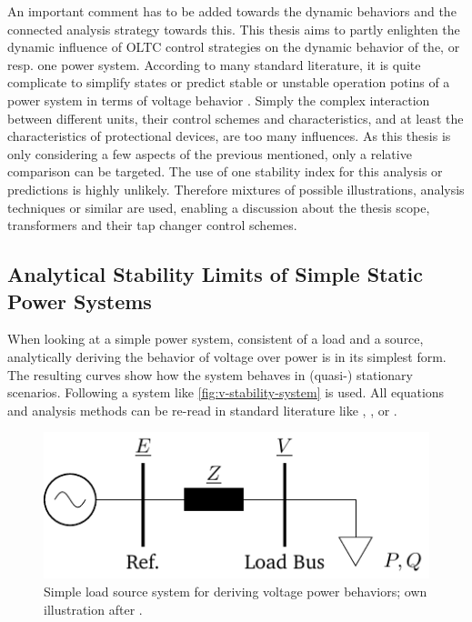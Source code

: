 An important comment has to be added towards the dynamic behaviors and the connected analysis strategy towards this.
This thesis aims to partly enlighten the dynamic influence of \acs{OLTC} control strategies on the dynamic behavior of the, or resp. one power system.
According to many standard literature, it is quite complicate to simplify states or predict stable or unstable operation potins of a power system in terms of voltage behavior \autocite{machowski_2020}.
Simply the complex interaction between different units, their control schemes and characteristics, and at least the characteristics of protectional devices, are too many influences.
As this thesis is only considering a few aspects of the previous mentioned, only a relative comparison can be targeted.
The use of one stability index for this analysis or predictions is highly unlikely.
Therefore mixtures of possible illustrations, analysis techniques or similar are used, enabling a discussion about the thesis scope, transformers and their tap changer control schemes.  
        
\subsection{Analytical Stability Limits of Simple Static Power Systems}
\label{sec:analytical-voltage-stability}

When looking at a simple power system, consistent of a load and a source, analytically deriving the behavior of voltage over power is in its simplest form.
The resulting curves show how the system behaves in (quasi-) stationary scenarios.
Following a system like \autoref{fig:v-stability-system} is used. 
All equations and analysis methods can be re-read in standard literature like \textcite{machowski_2020}, \textcite{kundur_2022}, or \textcite{cutsem_1998}. 

\begin{figure}[htbp!]
    \centering
    \includegraphics{./tikz_graphics/images/analytical_model.pdf}
    \caption[Simple load source system for deriving voltage power behaviors]{Simple load source system for deriving voltage power behaviors; own illustration after \autocite{machowski_2020,kundur_2022,milano_2010}.}
    \label{fig:v-stability-system}
\end{figure}

